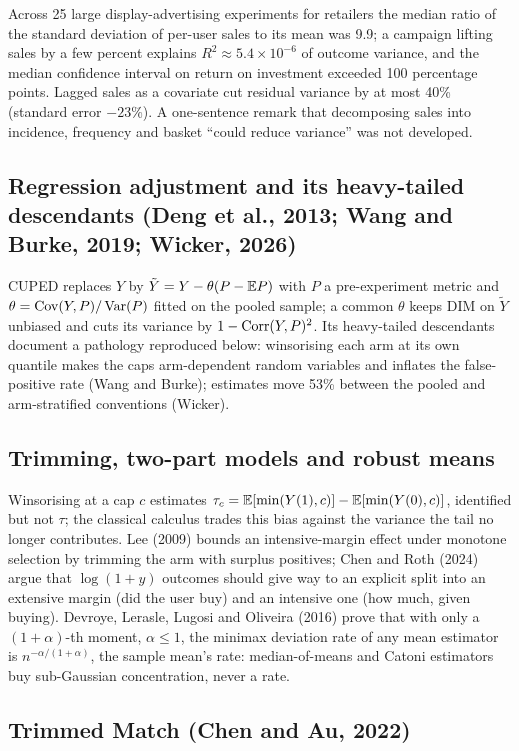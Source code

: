 Across 25 large display-advertising experiments for retailers the median ratio of the standard deviation of per-user sales to its mean was 9.9; a campaign lifting sales by a few percent explains $R^2 \approx 5.4\times10^{-6}$ of outcome variance, and the median confidence interval on return on investment exceeded 100 percentage points. Lagged sales as a covariate cut residual variance by at most 40\% (standard error $-23\%$). A one-sentence remark that decomposing sales into incidence, frequency and basket ``could reduce variance'' was not developed.

\subsection{Regression adjustment and its heavy-tailed descendants (Deng et al., 2013; Wang and Burke, 2019; Wicker, 2026)}

CUPED replaces $Y$ by $\tilde Y = Y - \theta(P - \mathbb{E} P)$ with $P$ a pre-experiment metric and $\theta = \operatorname{Cov}(Y, P)/\operatorname{Var}(P)$ fitted on the pooled sample; a common $\theta$ keeps DIM on $\tilde Y$ unbiased and cuts its variance by $1 - \operatorname{Corr}(Y, P)^2$. Its heavy-tailed descendants document a pathology reproduced below: winsorising each arm at its own quantile makes the caps arm-dependent random variables and inflates the false-positive rate (Wang and Burke); estimates move 53\% between the pooled and arm-stratified conventions (Wicker).

\subsection{Trimming, two-part models and robust means}

Winsorising at a cap $c$ estimates $\tau_c = \mathbb{E}[\min(Y(1), c)] - \mathbb{E}[\min(Y(0), c)]$, identified but not $\tau$; the classical calculus trades this bias against the variance the tail no longer contributes. Lee (2009) bounds an intensive-margin effect under monotone selection by trimming the arm with surplus positives; Chen and Roth (2024) argue that $\log(1 + y)$ outcomes should give way to an explicit split into an extensive margin (did the user buy) and an intensive one (how much, given buying). Devroye, Lerasle, Lugosi and Oliveira (2016) prove that with only a $(1 + \alpha)$-th moment, $\alpha \le 1$, the minimax deviation rate of any mean estimator is $n^{-\alpha/(1+\alpha)}$, the sample mean's rate: median-of-means and Catoni estimators buy sub-Gaussian concentration, never a rate.

\subsection{Trimmed Match (Chen and Au, 2022)}

